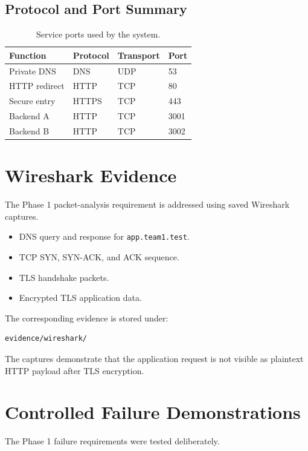 \documentclass[11pt,a4paper]{article}
\begin{document}
\subsection{Protocol and Port Summary}

\begin{table}[H]
\centering
\begin{tabular}{llll}
\toprule
\textbf{Function} & \textbf{Protocol} & \textbf{Transport} & \textbf{Port} \\
\midrule
Private DNS & DNS & UDP & 53 \\
HTTP redirect & HTTP & TCP & 80 \\
Secure entry & HTTPS & TCP & 443 \\
Backend A & HTTP & TCP & 3001 \\
Backend B & HTTP & TCP & 3002 \\
\bottomrule
\end{tabular}
\caption{Service ports used by the system.}
\end{table}

\section{Wireshark Evidence}

The Phase 1 packet-analysis requirement is addressed using saved
Wireshark captures.

\begin{itemize}
    \item DNS query and response for \texttt{app.team1.test}.
    \item TCP SYN, SYN-ACK, and ACK sequence.
    \item TLS handshake packets.
    \item Encrypted TLS application data.
\end{itemize}

The corresponding evidence is stored under:

\begin{lstlisting}
evidence/wireshark/
\end{lstlisting}

The captures demonstrate that the application request is not visible as
plaintext HTTP payload after TLS encryption.

\section{Controlled Failure Demonstrations}

The Phase 1 failure requirements were tested deliberately.
\end{document}
